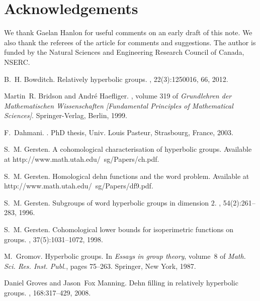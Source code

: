\section*{Acknowledgements}
We thank Gaelan Hanlon for useful comments on an early draft of this note. We also thank the referees of the article for comments and suggestions. 
The author is funded by the Natural Sciences and Engineering Research Council of Canada, NSERC.




\begin{thebibliography}{10}

B.~H. Bowditch.
\newblock Relatively hyperbolic groups.
, 22(3):1250016, 66, 2012.

Martin~R. Bridson and Andr{\'e} Haefliger.
, volume 319 of {\em
  Grundlehren der Mathematischen Wissenschaften [Fundamental Principles of
  Mathematical Sciences]}.
\newblock Springer-Verlag, Berlin, 1999.

F.~Dahmani.
.
\newblock PhD thesis, Univ. Louis Pasteur, Strasbourg, France, 2003.

S.~M. Gersten.
\newblock A cohomological characterisation of hyperbolic groups.
\newblock Available at http://www.math.utah.edu/~sg/Papers/ch.pdf.

S.~M. Gersten.
\newblock Homological dehn functions and the word problem.
\newblock Available at http://www.math.utah.edu/~sg/Papers/df9.pdf.

S.~M. Gersten.
\newblock Subgroups of word hyperbolic groups in dimension {$2$}.
, 54(2):261--283, 1996.

S.~M. Gersten.
\newblock Cohomological lower bounds for isoperimetric functions on groups.
, 37(5):1031--1072, 1998.

M.~Gromov.
\newblock Hyperbolic groups.
\newblock In {\em Essays in group theory}, volume~8 of {\em Math. Sci. Res.
  Inst. Publ.}, pages 75--263. Springer, New York, 1987.

Daniel Groves and Jason~Fox Manning.
\newblock Dehn filling in relatively hyperbolic groups.
, 168:317--429, 2008.


\end{thebibliography}
